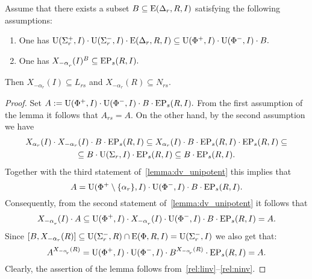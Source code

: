 
\begin{lemma}\label{lemma:Stein_reduction}
Assume that there exists a subset $B \subseteq \operatorname{E}(\Delta_r, R, I)$ satisfying the following assumptions:
\begin{enumerate}
 \item\label{stein_cond1} One has $\operatorname{U}(\Sigma^+_r, I)\cdot \operatorname{U}(\Sigma^-_r, I) \cdot \operatorname{E}(\Delta_r, R, I) \subseteq \operatorname{U}(\Phi^+, I)\cdot \operatorname{U}(\Phi^-, I) \cdot B.$
 \item\label{stein_cond2} One has $X_{-\alpha\ssub{r}}(I)^B \subseteq \EP_s(R, I).$
\end{enumerate}
Then $X_{-\alpha_r}(I) \subseteq L_{rs}$ and $X_{-\alpha_r}(R) \subseteq N_{rs}.$
\end{lemma}
\begin{proof} Set $A:=\operatorname{U}(\Phi^+, I)\cdot \operatorname{U}(\Phi^-, I) \cdot B \cdot \operatorname{EP}_s(R, I).$
From the first assumption of the lemma it follows that $A_{rs}=A$.
On the other hand, by the second assumption we have
\begin{multline*} X_{\alpha_r}(I) \cdot X_{-\alpha_r}(I) \cdot B \cdot \operatorname{EP}_s(R, I) \subseteq 
 X_{\alpha_r}(I) \cdot B \cdot \operatorname{EP}_s(R, I) \cdot \operatorname{EP}_s(R, I) \subseteq \\
 \subseteq B \cdot \operatorname{U}(\Sigma_r, I) \cdot \operatorname{EP}_s(R, I) \subseteq 
 B \cdot \operatorname{EP}_s(R, I). \end{multline*}
Together with the third statement of~\cref{lemma:dv_unipotent} this implies that
\begin{equation*} \label{rel:sred} A = \operatorname{U}(\Phi^+\setminus\{\alpha_r\}, I) \cdot \operatorname{U}(\Phi^-, I) \cdot B \cdot \operatorname{EP}_s(R, I). \end{equation*}
Consequently, from the second statement of~\cref{lemma:dv_unipotent} it follows that
\begin{equation} \label{rel:linv} X_{-\alpha\ssub{r}}(I) \cdot A \subseteq \U(\Phi^+, I) \cdot X_{-\alpha\ssub{r}}(I) \cdot \U(\Phi^-, I) \cdot B \cdot \EP_s(R, I) = A. \end{equation}
Since $[B, X_{-\alpha_r}(R)] \subseteq \operatorname{U}(\Sigma_r^-, R) \cap \operatorname{E}(\Phi, R, I) = \operatorname{U}(\Sigma_r^-, I)$ we also get that:
\begin{equation} \label{rel:ninv} A^{X_{-\alpha\ssub{r}}(R)} = \U(\Phi^+, I) \cdot \U(\Phi^-, I) \cdot B ^{X_{-\alpha\ssub{r}}(R)} \cdot \EP_s(R, I) = A. \end{equation}
Clearly, the assertion of the lemma follows from~\ref{rel:linv}--\ref{rel:ninv}. \end{proof}

